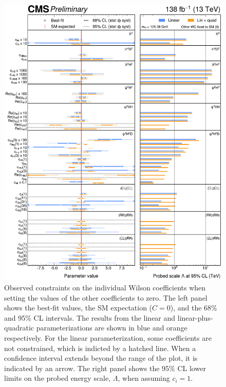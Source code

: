 \begin{figure}
  \centering
  \includegraphics[width=\textwidth]{Figures/EFT/HIG-21-018-Figure_017.pdf}
  \caption[Individual Constraints on the SMEFT Wilson Coefficients]{Observed constraints on the individual Wilson coefficients when setting the values of the other coefficients to zero. The left panel shows the best-fit values, the SM expectation ($C=0$), and the 68\% and 95\% CL intervals. The results from the linear and linear-plus-quadratic parameterizations are shown in blue and orange respectively. For the linear parameterization, some coefficients are not constrained, which is indicted by a hatched line. When a confidence interval extends beyond the range of the plot, it is indicated by an arrow. The right panel shows the 95\% CL lower limits on the probed energy scale, $\Lambda$, when assuming $c_i=1$.}\label{fig:smeft_results_nominal_observed}
\end{figure}